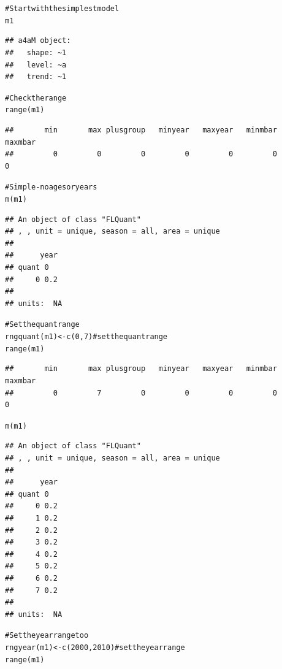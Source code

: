 \documentclass[a4paper,english,10pt]{article}\usepackage[]{graphicx}\usepackage[]{color}
\makeatletter
\newcommand{\hlnum}[1]{\textcolor[rgb]{0.2,0.2,0.2}{#1}}%
\newcommand{\hlcom}[1]{\textcolor[rgb]{0.2,0.267,0.4}{#1}}%
\newcommand{\hlstd}[1]{\textcolor[rgb]{0,0,0}{#1}}%
\newcommand{\hlkwb}[1]{\textcolor[rgb]{0.361,0.506,0.596}{#1}}%
\newcommand{\hlkwd}[1]{\textcolor[rgb]{0.361,0.506,0.596}{#1}}%
\newenvironment{kframe}{%
 \def\at@end@of@kframe{}%
 \ifinner\ifhmode%
  \def\at@end@of@kframe{\end{minipage}}%
  \begin{minipage}{\columnwidth}%
 \fi\fi%
 \def\FrameCommand##1{\hskip\@totalleftmargin \hskip-\fboxsep
 \colorbox{shadecolor}{##1}\hskip-\fboxsep
     \hskip-\linewidth \hskip-\@totalleftmargin \hskip\columnwidth}%
 \MakeFramed {\advance\hsize-\width
   \@totalleftmargin\z@ \linewidth\hsize
   \@setminipage}}%
 {\par\unskip\endMakeFramed%
 \at@end@of@kframe}
\newenvironment{knitrout}{}{} %
\makeatother
\begin{document}
\begin{knitrout}
\color{fgcolor}\begin{kframe}
\begin{alltt}
\hlcom{# Start with the simplest model}
\hlstd{m1}
\end{alltt}
\begin{verbatim}
## a4aM object:
##   shape: ~1
##   level: ~a
##   trend: ~1
\end{verbatim}
\begin{alltt}
\hlcom{# Check the range}
\hlkwd{range}\hlstd{(m1)}
\end{alltt}
\begin{verbatim}
##       min       max plusgroup   minyear   maxyear   minmbar   maxmbar 
##         0         0         0         0         0         0         0
\end{verbatim}
\begin{alltt}
\hlcom{# Simple - no ages or years}
\hlkwd{m}\hlstd{(m1)}
\end{alltt}
\begin{verbatim}
## An object of class "FLQuant"
## , , unit = unique, season = all, area = unique
## 
##      year
## quant 0  
##     0 0.2
## 
## units:  NA
\end{verbatim}
\begin{alltt}
\hlcom{# Set the quant range}
\hlkwd{rngquant}\hlstd{(m1)} \hlkwb{<-} \hlkwd{c}\hlstd{(}\hlnum{0}\hlstd{,}\hlnum{7}\hlstd{)} \hlcom{# set the quant range}
\hlkwd{range}\hlstd{(m1)}
\end{alltt}
\begin{verbatim}
##       min       max plusgroup   minyear   maxyear   minmbar   maxmbar 
##         0         7         0         0         0         0         0
\end{verbatim}
\begin{alltt}
\hlkwd{m}\hlstd{(m1)}
\end{alltt}
\begin{verbatim}
## An object of class "FLQuant"
## , , unit = unique, season = all, area = unique
## 
##      year
## quant 0  
##     0 0.2
##     1 0.2
##     2 0.2
##     3 0.2
##     4 0.2
##     5 0.2
##     6 0.2
##     7 0.2
## 
## units:  NA
\end{verbatim}
\begin{alltt}
\hlcom{# Set the year range too}
\hlkwd{rngyear}\hlstd{(m1)} \hlkwb{<-} \hlkwd{c}\hlstd{(}\hlnum{2000}\hlstd{,} \hlnum{2010}\hlstd{)} \hlcom{# set the year range}
\hlkwd{range}\hlstd{(m1)}

\end{alltt}
\end{kframe}
\end{knitrout}
\end{document}
